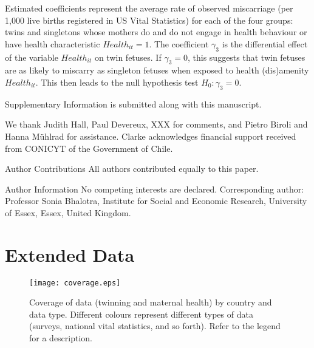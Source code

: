 \documentclass{nature}
\begin{document}
\begin{linenumbers}
Estimated coefficients represent the average rate of observed miscarriage (per 1,000 live births registered in US Vital Statistics) for each of the four groups: twins and singletons whose mothers do and do not engage in health behaviour or have health characteristic $Health_{it}=1$. The coefficient $\gamma_3$ is the differential effect of the variable $Health_{it}$ on twin fetuses.  If $\gamma_3=0$, this suggests that twin fetuses are as likely to miscarry as singleton fetuses when exposed to health (dis)amenity $Health_{it}$.  This then leads to the null hypothesis test $H_0: \gamma_3=0$.




\clearpage



\clearpage
\begin{addendum}
 \item[Supplementary Information] is submitted along with this manuscript.
 \item We thank Judith Hall, Paul Devereux, XXX for comments, and Pietro Biroli and Hanna M\"uhlrad for assistance.  Clarke acknowledges financial support received from CONICYT of the Government of Chile.
 \item[Author Contributions] All authors contributed equally to this paper.
 \item[Author Information] No competing interests are declared.  Corresponding author: Professor Sonia Bhalotra, Institute for Social and Economic Research, University of Essex, Essex, United Kingdom.
\end{addendum}

\clearpage
\section{Extended Data}
\begin{spacing}{1}
\begin{figure}[htpb!]
\texttt{[image: coverage.eps]}
\caption{Coverage of data (twinning and maternal health) by country and data type.  Different colours represent different types of data (surveys, national vital statistics, and so forth).  Refer to the legend for a description.}
\label{fig:twincoverage}
\end{figure}



\end{spacing}
\end{linenumbers}
\end{document}
